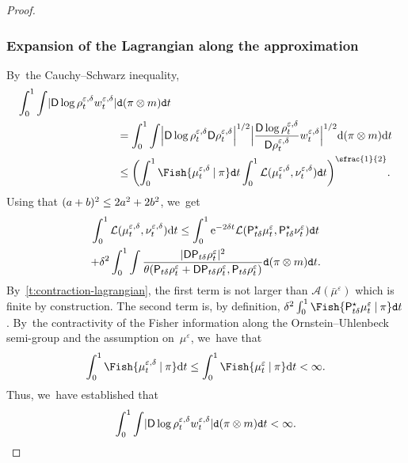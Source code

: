 \documentclass[10pt]{amsart}
\theoremstyle{definition}
\theoremstyle{remark}
\DeclarePairedDelimiter{\paren}{\lparen}{\rparen}
\DeclarePairedDelimiter{\abs}{\lvert}{\rvert}
\newcommand{\given}[1][]{%
\nonscript\:#1\vert
\allowbreak
\nonscript\:
\mathopen{}}
\begin{document}
\begin{proof}
\subsubsection*{Expansion of the Lagrangian along the approximation}
By~the Cauchy--Schwarz inequality,
\begin{equation*}
\begin{split}
\int_{0}^{1} \int \abs{\mathsf{D} \log \rho^{\varepsilon,\delta}_{t} w^{\varepsilon,\delta}_{t}}& \mathtt{d} (\pi \otimes m) \mathtt{d} t
\\&= \int_{0}^{1} \int \abs*{ \mathsf{D} \log \rho^{\varepsilon,\delta}_{t} \mathsf{D} \rho^{\varepsilon,\delta}_{t}}^{1/2} \abs[\Big]{\frac{\mathsf{D} \log \rho^{\varepsilon,\delta}_{t}}{\mathsf{D} \rho^{\varepsilon,\delta}_{t}} w^{\varepsilon,\delta}_{t}}^{1/2} \mathrm{d} (\pi \otimes m) \mathrm{d} t
\\& \leq \paren*{\int_{0}^{1} \Fish{ \mu^{\varepsilon,\delta}_{t} \given \pi} \mathtt{d} t \int_{0}^{1} \mathcal{L}(\mu^{\varepsilon,\delta}_{t}, \nu^{\varepsilon,\delta}_{t}) \mathtt{d} t}^{\sfrac{1}{2}}.
\end{split}
\end{equation*}
Using that $\paren{a+b}^{2} \le 2a^{2} + 2b^{2}$, we~get
\begin{multline*}
\int_{0}^{1} \mathcal{L}(\mu^{\varepsilon,\delta}_{t}, \nu^{\varepsilon,\delta}_{t}) \mathrm{d} t \leq \int_{0}^{1} \mathrm{e}^{-2\delta t} \mathcal{L}(\mathsf{P}^{\star}_{t \delta} \mu^{\varepsilon}_{t}, \mathsf{P}^{\star}_{t \delta} \nu^{\varepsilon}_{t}) \mathtt{d} t
\\+ \delta^{2} \int_{0}^{1} \int \frac{\abs{\mathsf{D} \mathsf{P}_{t \delta} \rho^{\varepsilon}_{t}}^{2}}{\theta(\mathsf{P}_{t \delta} \rho^{\varepsilon}_{t} + \mathsf{D} \mathsf{P}_{t \delta} \rho^{\varepsilon}_{t}, \mathsf{P}_{t \delta} \rho^{\varepsilon}_{t})} \mathtt{d} (\pi \otimes m) \mathtt{d} t.
\end{multline*}
By~\cref{t:contraction-lagrangian}, the first term is not larger than $\mathcal{A}(\bar{\mu}^{\varepsilon})$ which is finite by construction.
The second term is, by definition, $\delta^{2} \int_{0}^{1} \Fish{ \mathsf{P}^{\star}_{t\delta} \mu_{t}^{\varepsilon} \given \pi} \mathtt{d} t$.
By~the contractivity of the Fisher information along the Ornstein--Uhlenbeck semi-group and the assumption on~$\mu^{\varepsilon}$, we~have that
\begin{equation*}
\int_{0}^{1} \Fish{ \mu^{\varepsilon,\delta}_{t} \given \pi } \mathrm{d} t \leq \int_{0}^{1} \Fish{ \mu^{\varepsilon}_{t} \given \pi } \mathrm{d} t < \infty.
\end{equation*}
Thus, we~have established that
\begin{equation}\label{e:finiteness-w-d-log-rho}
\int_{0}^{1} \int \abs{\mathsf{D} \log \rho^{\varepsilon,\delta}_{t} w^{\varepsilon,\delta}_{t}} \mathtt{d} (\pi \otimes m) \mathtt{d} t < \infty.
\end{equation}


\end{proof}
\end{document}
